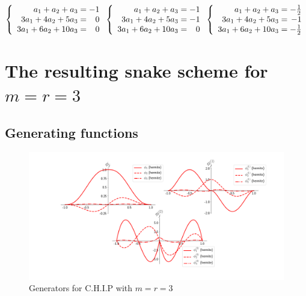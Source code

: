 \documentclass[a4paper, 11pt]{article}
\begin{document}
\begin{equation*}
  \left\{
  \begin{array}{r @{{}={}} r}
    a_1 + a_2  + a_3 & -1 \\
    3a_1 + 4a_2 + 5a_3 & 0 \\
    3a_1 + 6a_2  + 10a_3 & 0\\
  \end{array}
  \right.
  \hfill
  \left\{
  \begin{array}{r @{{}={}} r}
    a_1 + a_2  + a_3 & -1 \\
    3a_1 + 4a_2 + 5a_3 & -1 \\
    3a_1 + 6a_2  + 10a_3 & 0\\
  \end{array}
  \right.
  \hfill
  \left\{
  \begin{array}{r @{{}={}} r}
    a_1 + a_2  + a_3 & -\frac{1}{2} \\
    3a_1 + 4a_2 + 5a_3 & -1 \\
    3a_1 + 6a_2  + 10a_3 & -\frac{1}{2} \\
  \end{array}
  \right.
\end{equation*}

\section{The resulting snake scheme for $m=r=3$}

\subsection{Generating functions}

\begin{figure}[!h]
  \centering
  \includegraphics[width=\textwidth]{basis.png}
  \caption{Generators for C.H.I.P with $m=r=3$}\label{fig:basis}
\end{figure}
\end{document}
